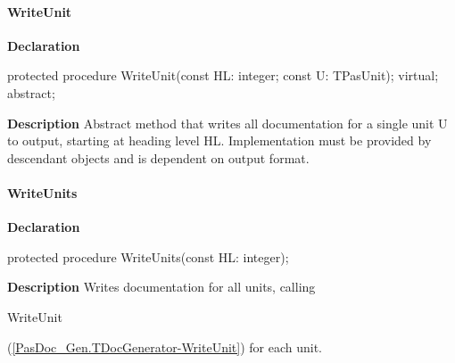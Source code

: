 \documentclass{report}
\newif\ifpdf
\begin{document}
\paragraph*{WriteUnit}\hspace*{\fill}

\label{PasDoc_Gen.TDocGenerator-WriteUnit}
\begin{list}{}{
\setlength{\itemindent}{0cm}
\setlength{\listparindent}{0cm}
\setlength{\leftmargin}{\evensidemargin}
\addtolength{\leftmargin}{\tmplength}
\settowidth{\labelsep}{X}
\addtolength{\leftmargin}{\labelsep}
\setlength{\labelwidth}{\tmplength}
}
\item[\textbf{Declaration}\hfill]
\ifpdf
\begin{flushleft}
\fi
\begin{ttfamily}
protected procedure WriteUnit(const HL: integer; const U: TPasUnit); virtual; abstract;\end{ttfamily}

\ifpdf
\end{flushleft}
\fi

\par
\item[\textbf{Description}]
Abstract method that writes all documentation for a single unit U to output, starting at heading level HL. Implementation must be provided by descendant objects and is dependent on output format.

\end{list}
\paragraph*{WriteUnits}\hspace*{\fill}

\label{PasDoc_Gen.TDocGenerator-WriteUnits}
\begin{list}{}{
\setlength{\itemindent}{0cm}
\setlength{\listparindent}{0cm}
\setlength{\leftmargin}{\evensidemargin}
\addtolength{\leftmargin}{\tmplength}
\settowidth{\labelsep}{X}
\addtolength{\leftmargin}{\labelsep}
\setlength{\labelwidth}{\tmplength}
}
\item[\textbf{Declaration}\hfill]
\ifpdf
\begin{flushleft}
\fi
\begin{ttfamily}
protected procedure WriteUnits(const HL: integer);\end{ttfamily}

\ifpdf
\end{flushleft}
\fi

\par
\item[\textbf{Description}]
Writes documentation for all units, calling \begin{ttfamily}WriteUnit\end{ttfamily}(\ref{PasDoc_Gen.TDocGenerator-WriteUnit}) for each unit.

\end{list}
\end{document}
